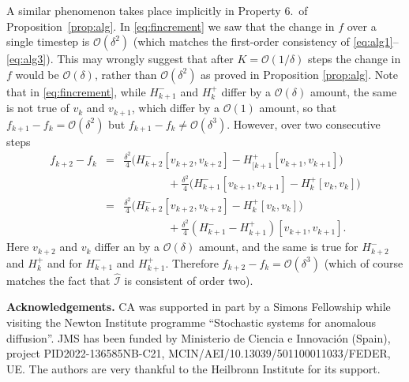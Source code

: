 \documentclass[10pt]{article}
\begin{document}
A similar phenomenon takes place implicitly in Property 6.\ of Proposition~\ref{prop:alg}. In \eqref{eq:fincrement} we saw that the change in \(f\) over a single timestep is \(\mathcal{O}(\delta^2)\) (which matches the first-order consistency of  \eqref{eq:alg1}--\eqref{eq:alg3}). This may wrongly suggest that after \(K=\mathcal{O}(1/\delta)\) steps the change in \(f\) would be \(\mathcal{O}(\delta)\), rather than  \(\mathcal{O}(\delta^2)\) as proved in Proposition \ref{prop:alg}.
 Note that in \eqref{eq:fincrement}, while \(H_{k+1}^-\) and \(H_k^+\) differ by a \(\mathcal{O}(\delta)\) amount, the same is not true of \(v_k\) and \(v_{k+1}\), which differ by a \(\mathcal{O}(1)\) amount, so that \(f_{k+1}-f_k =\mathcal{O}(\delta^2)\) but \(f_{k+1}-f_k \neq \mathcal{O}(\delta^3)\). However, over two consecutive steps
\begin{eqnarray*}
f_{k+2}-f_k &=& \frac{\delta^2}{4}  \Big( H_{k+2}^-[v_{k+2},v_{k+2}]-H_{[k+1}^+[v_{k+1},v_{k+1}]\Big)\\
%
&& \qquad\qquad +\frac{\delta^2}{4}  \Big( H_{k+1}^-[v_{k+1},v_{k+1}]-H_k^+[v_k,v_k]\Big)\\
%
&=& \frac{\delta^2}{4}\Big( H_{k+2}^-[v_{k+2},v_{k+2}]-H_k^+[v_k,v_k]\Big)\\
&&\qquad\qquad +\frac{\delta^2}{4}(H_{k+1}^- -H_{k+1}^+)[v_{k+1},v_{k+1}].
\end{eqnarray*}
Here  \(v_{k+2}\) and \( v_k\) differ an by a \(\mathcal{O}(\delta)\) amount, and the same is true for \( H_{k+2}^- \) and \(H_k^+\) and for  \(H_{k+1}^-\)  and \(H_{k+1}^+\). Therefore \(f_{k+2}-f_k = \mathcal{O}(\delta^3)\) (which of course matches the fact that \(\widehat{\mathcal I}\) is consistent of order two).

\bigskip

{\bf Acknowledgements.}  CA was supported in part by a Simons Fellowship while visiting the Newton Institute programme ``Stochastic systems for anomalous diffusion''. JMS has been funded by Ministerio de Ciencia e Innovaci\'{o}n (Spain), project PID2022-136585NB-C21, MCIN/AEI/10.13039/501100011033/FED\-ER, UE.
The authors are very thankful to the  Heilbronn Institute for its support.



\end{document}
